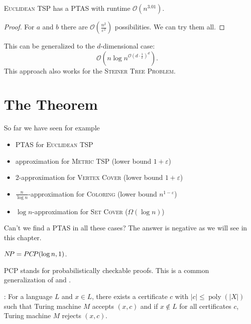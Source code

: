 \documentclass[../skript.tex]{subfiles}
\begin{document}
\begin{theorem} %
\label{thm:98}
\textsc{Euclidean TSP} has a \ac{PTAS} with runtime $\mathcal{O}\left(n^{3.01} \right)$.
\end{theorem}
\begin{proof}
For $a$ and $b$ there are $\mathcal{O} \left( \frac{n^2}{\varepsilon^2} \right)$ possibilities. We can try them all.
\end{proof}
This can be generalized to the $d$-dimensional case:
\[
	\mathcal{O}(n \log n^{\mathcal{O} \left( d \cdot \frac{1}{\varepsilon} \right)^d}).
\]
This approach also works for the \textsc{Steiner Tree Problem}.
\chapter{The \texorpdfstring{\PCP{}}{PCP} Theorem} %
\label{sec:c7}
So far we have seen for example
\begin{itemize}
\item \ac{PTAS} for \textsc{Euclidean TSP}
\item {} approximation for \textsc{Metric TSP} (lower bound $1 + \varepsilon$)
\item 2-approximation for \textsc{Vertex Cover} (lower bound $1 + \varepsilon$)
\item $\frac{n}{\log n}$-approximation for \textsc{Coloring} (lower bound $n^{1-\varepsilon}$)
\item $\log n$-approximation for \textsc{Set Cover} ($\Omega(\log n)$)
\end{itemize}
Can't we find a PTAS in all these cases? The answer is negative as we will see in this chapter.
\begin{theorem} %
\label{thm:99}
$N \! P = PC \! P(\log n, 1)$.
\end{theorem}
PCP stands for probabilistically checkable proofs. This is a common generalization of \NP{} and \coRP{}.

\NP{}: For a language $L$ and $x \in L$, there exists a certificate $c$ with $|c| \leq \operatorname{poly}(|X|)$ such that Turing machine $M$ accepts $(x, c)$ and if $x \notin L$ for all certificates $c$, Turing machine $M$ rejects $(x, c)$.
\end{document}
